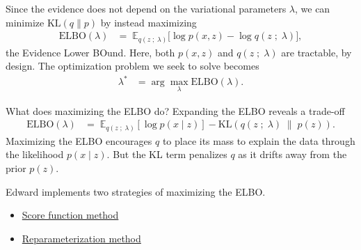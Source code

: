 Since the evidence does not depend on the variational parameters $\lambda$,
we can minimize $\text{KL}(q\|p)$ by instead maximizing
\begin{align*}
  \text{ELBO}(\lambda)
  &=\;
  \mathbb{E}_{q(z\;;\;\lambda)}
  \big[
  \log p(x, z)
  -
  \log q(z\;;\;\lambda)
  \big],
\end{align*}
the Evidence Lower BOund. Here, both $p(x,z)$ and $q(z\;;\;\lambda)$ are
tractable, by design. The optimization problem we seek to solve becomes
\begin{align*}
  \lambda^*
  &=
  \arg \max_\lambda \text{ELBO}(\lambda).
\end{align*}

What does maximizing the ELBO do? Expanding the ELBO reveals a trade-off
\begin{align*}
  \text{ELBO}(\lambda) 
  &=\;
  \mathbb{E}_{q(z \;;\; \lambda)}[\log p(x \mid z)]  
  - \text{KL}(q(z \;;\; \lambda) \;\|\; p(z)).
\end{align*}
Maximizing the ELBO encourages $q$ to place its mass to explain the data through
the likelihood $p(x \mid z)$. But the KL term penalizes $q$ as it drifts away
from the prior $p(z)$. 

Edward implements two strategies of maximizing the ELBO.
\begin{itemize}
    \item \href{tut_KLqp_score.html}{Score function method}
    \item \href{tut_KLqp_reparam.html}{Reparameterization method}
  \end{itemize}
